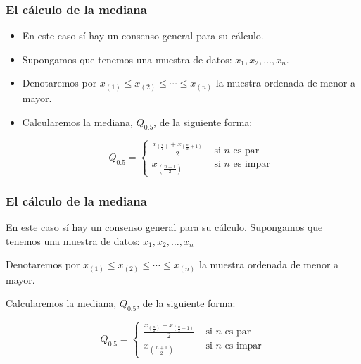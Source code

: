 \begin{frame}
\frametitle{El cálculo de la mediana}
\begin{itemize}
\item En este caso sí hay un consenso general para su cálculo.
\item Supongamos que tenemos una muestra de datos: $x_1,x_2,\ldots, x_n$.
\item Denotaremos por $x_{(1)}\leq x_{(2)}\leq \cdots \leq x_{(n)}$ la muestra ordenada de menor a mayor.
\item Calcularemos la mediana, $Q_{0.5}$, de la siguiente forma:

$$Q_{0.5}=\left\{\begin{array}{ll}
\frac{x_{\left(\frac{n}{2}\right)}+x_{\left(\frac{n}{2}+1\right)}}{2} & \mbox{ si } n \mbox{ es par}\\
x_{\left(\frac{n+1}{2}\right)} & \mbox{ si  }  n \mbox{ es impar}\end{array}\right.
$$
\end{itemize}
\end{frame}





\begin{frame}
\frametitle{El cálculo de la mediana}

En este caso sí hay un consenso general para su cálculo. Supongamos que tenemos una muestra de datos: $x_1,x_2,\ldots, x_n$

Denotaremos por $x_{(1)}\leq x_{(2)}\leq \cdots \leq x_{(n)}$ la muestra ordenada de menor a mayor.

Calcularemos la mediana, $Q_{0.5}$, de la siguiente forma:

$$Q_{0.5}=\left\{\begin{array}{ll}
\frac{x_{\left(\frac{n}{2}\right)}+x_{\left(\frac{n}{2}+1\right)}}{2} & \mbox{ si } n \mbox{ es par}\\
x_{\left(\frac{n+1}{2}\right)} & \mbox{ si  }  n \mbox{ es impar}\end{array}\right.
$$
\end{frame}


